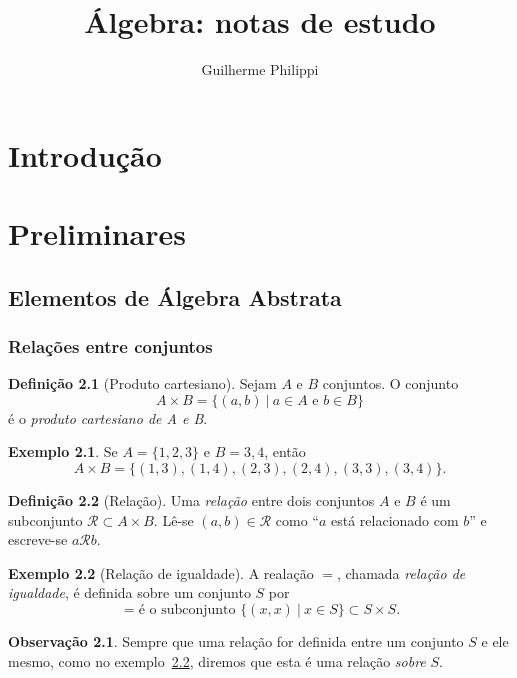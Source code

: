\documentclass[a4paper,12pt]{report}
\title{Álgebra: notas de estudo}
\author{Guilherme Philippi}
\theoremstyle{plain}
\theoremstyle{definition}
\newtheorem{definicao}{Definição}[section]
\newtheorem{observacao}{Observação}[section]
\newtheorem{exemplo}{Exemplo}[section]
\begin{document}
\maketitle
\tableofcontents

\chapter{Introdução}

\newpage

\chapter{Preliminares}

\section{Elementos de Álgebra Abstrata}

\subsection{Relações entre conjuntos}

\begin{definicao}[Produto cartesiano]
	Sejam $A$ e $B$ conjuntos. O conjunto $$A\times B = \{(a,b) \ | \ a\in A \text{ e } b\in B\}$$
	é o \emph{produto cartesiano de A e B}.
\end{definicao}

\begin{exemplo}
	Se $A = \{1,2,3\}$ e $B = {3,4}$, então $$A\times B = \{(1,3),(1,4),(2,3),(2,4),(3,3),(3,4)\}.$$
\end{exemplo}

\begin{definicao}[Relação]
	Uma	\emph{relação} entre dois conjuntos $A$ e $B$ é um subconjunto $\mathcal{R}\subset A\times B$. Lê-se $(a,b) \in \mathcal{R}$ como ``$a$ está relacionado com $b$'' e escreve-se $a\mathcal{R}b$.
\end{definicao}

\begin{exemplo}[Relação de igualdade]\label{ex:igualdade}
	A realação $=$, chamada \emph{relação de igualdade}, é definida sobre um conjunto $S$ por $$= \text{é o subconjunto } \{(x,x) \ |\ x\in S\}\subset S\times S.$$
\end{exemplo}

\begin{observacao}
	Sempre que uma relação for definida entre um conjunto $S$ e ele mesmo, como no exemplo~\ref{ex:igualdade}, diremos que esta é uma relação \emph{sobre} $S$.
\end{observacao}
\end{document}
